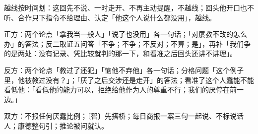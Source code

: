 \documentclass[prep,both]{debate}
\begin{document}
\begin{fields}
\begin{checklist}
\item 越线按时间划：这回先不说、一时走开、不再主动提醒，不越线；回头他开口也不听、合作只下指令不给理由、认定「他这个人说什么都没用」，越线。
\item 正方：两个论点「拿我当一般人」「说了也没用」各一句话；「对屡教不改的怎么办」的答法；反二取证五问答「不争；不争；不反对；不算；是」，再补「我们争的是两处：没有记录、凭比较就判的那一下，和看准之后回头还讲不讲理」。
\item 反方：两个论点「教过了还犯」「恼他不弃他」各一句话；分格问题「这个例子里，他被教过没有？」；「厌了之后交涉还是走开」的答法；看准了这个人蠢能不能看低他：「看低他的能力可以，拒绝给他作为人的尊重不行；我们的厌停在前一边。」
\item 双方：不报任何厌蠢比例；〔智〕先搭桥；每日商报一案三句一起说、不标说话人；康德整句引；推论被问就认。
\end{checklist}
\end{fields}
\end{document}
